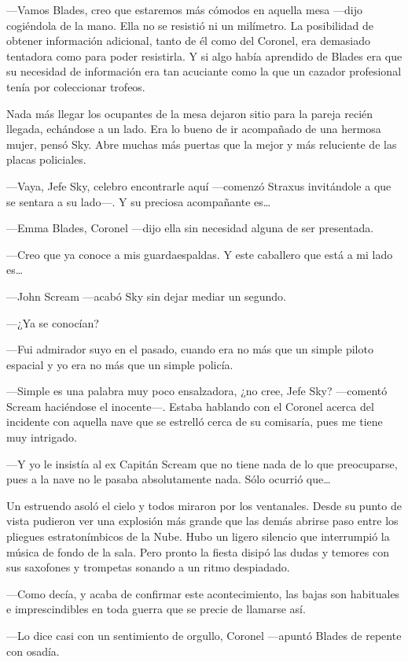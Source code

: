 ---Vamos Blades, creo que estaremos más cómodos en aquella mesa ---dijo cogiéndola de la mano. Ella no se resistió ni un milímetro. La posibilidad de obtener información adicional, tanto de él como del Coronel, era demasiado tentadora como para poder resistirla. Y si algo había aprendido de Blades era que su necesidad de información era tan acuciante como la que un cazador profesional tenía por coleccionar trofeos.

Nada más llegar los ocupantes de la mesa dejaron sitio para la pareja recién llegada, echándose a un lado. Era lo bueno de ir acompañado de una hermosa mujer, pensó Sky. Abre muchas más puertas que la mejor y más reluciente de las placas policiales.

---Vaya, Jefe Sky, celebro encontrarle aquí ---comenzó Straxus invitándole a que se sentara a su lado---. Y su preciosa acompañante es\dots

---Emma Blades, Coronel ---dijo ella sin necesidad alguna de ser presentada.

---Creo que ya conoce a mis guardaespaldas. Y este caballero que está a mi lado es\dots

---John Scream ---acabó Sky sin dejar mediar un segundo.

---¿Ya se conocían?

---Fui admirador suyo en el pasado, cuando era no más que un simple piloto espacial y yo era no más que un simple policía.

---Simple es una palabra muy poco ensalzadora, ¿no cree, Jefe Sky? ---comentó Scream haciéndose el inocente---. Estaba hablando con el Coronel acerca del incidente con aquella nave que se estrelló cerca de su comisaría, pues me tiene muy intrigado.

---Y yo le insistía al ex Capitán Scream que no tiene nada de lo que preocuparse, pues a la nave no le pasaba absolutamente nada. Sólo ocurrió que\dots

Un estruendo asoló el cielo y todos miraron por los ventanales. Desde su punto de vista pudieron ver una explosión más grande que las demás abrirse paso entre los pliegues estratonímbicos de la Nube. Hubo un ligero silencio que interrumpió la música de fondo de la sala. Pero pronto la fiesta disipó las dudas y temores con sus saxofones y trompetas sonando a un ritmo despiadado.

---Como decía, y acaba de confirmar este acontecimiento, las bajas son habituales e imprescindibles en toda guerra que se precie de llamarse así.

---Lo dice casi con un sentimiento de orgullo, Coronel ---apuntó Blades de repente con osadía.

